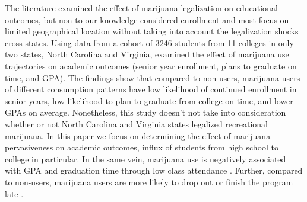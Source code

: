 \documentclass[12pt]{article}%
\begin{document}
The literature examined the effect of marijuana legalization on educational outcomes, but non to our knowledge considered enrollment and most focus on limited geographical location without taking into account the legalization shocks cross states.
 Using data from a cohort of 3246 students from 11 colleges in only two states, North Carolina and Virginia, \cite{suerken2016marijuana} examined the effect of marijuana use trajectories on academic outcomes (senior year enrollment, plans to graduate on time, and GPA). The findings show that compared to non-users, marijuana users of different consumption patterns have low likelihood of continued enrollment in senior years, low likelihood to plan to graduate from college on time, and lower GPAs on average. Nonetheless, this study doesn't not  take into consideration whether or not North Carolina and Virginia states legalized recreational marijuana. In this paper we focus on determining the effect of marijuana pervasiveness on academic outcomes, influx of students from high school to college in particular. In the same vein, marijuana use is negatively associated with GPA and graduation time through low class attendance \citep{arria2015academic}. Further, compared to non-users, marijuana users are more likely to drop out or finish the program late \citep{suerken2016marijuana}.
\end{document}
